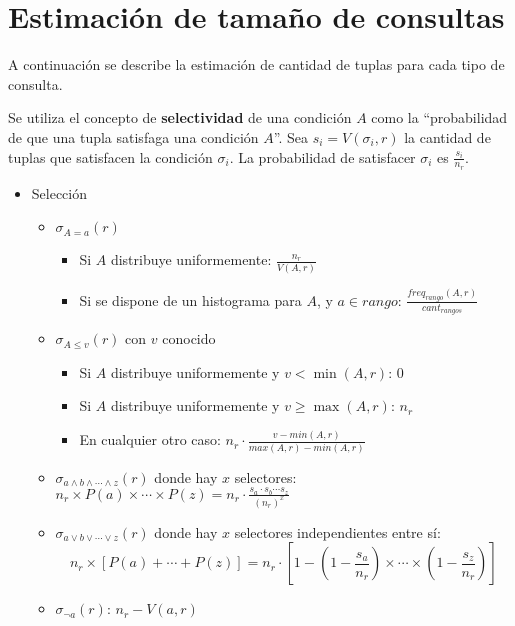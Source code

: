 \documentclass[a4paper, twoside]{article}
\begin{document}
\section{Estimación de tamaño de consultas}
A continuación se describe la estimación de cantidad de tuplas para cada tipo de consulta. 

Se utiliza el concepto de \textbf{selectividad} de una condición $A$ como la ``probabilidad de que una tupla satisfaga una condición $A$''. Sea $s_{i}=V(\sigma_{i},r)$ la cantidad de tuplas que satisfacen la condición $\sigma_{i}$. La probabilidad de satisfacer $\sigma_{i}$ es $\frac{s_{i}}{n_{r}}$.
\begin{itemize}
	\item Selección
	\begin{itemize}
		\item $\sigma_{A=a}(r)$
		\begin{itemize}
			\item Si $A$ distribuye uniformemente: $\frac{n_{r}}{V(A,r)}$
			\item Si se dispone de un histograma para $A$, y $a\in rango$: $\frac{freq_{rango}(A,r)}{cant_{rangos}}$
		\end{itemize}
		\item $\sigma_{A\leq v}(r)$ con $v$ conocido
		\begin{itemize}
			\item Si $A$ distribuye uniformemente y $v<\min(A,r)$: $0$
			\item Si $A$ distribuye uniformemente y $v\geq\max(A,r)$: $n_{r}$
			\item En cualquier otro caso: $n_{r}\cdot\frac{v-min(A,r)}{max(A,r)-min(A,r)}$
		\end{itemize}
		\item $\sigma_{a\wedge b\wedge\cdots\wedge z}(r)$ donde hay $x$ selectores: $n_{r}\times P(a)\times\cdots\times P(z)=n_{r}\cdot\frac{s_{a}\cdot s_{b}\cdots s_{z}}{\left(n_{r}\right)^{x}}$
		\item $\sigma_{a\lor b\lor\cdots\lor z}(r)$ donde hay $x$ selectores independientes entre sí: 
		\[
			n_{r}\times\left[P(a)+\cdots+P(z)\right]=n_{r}\cdot\left[1-\left(1-\frac{s_{a}}{n_{r}}\right)\times\cdots\times\left(1-\frac{s_{z}}{n_{r}}\right)\right]
		\]
		\item $\sigma_{\lnot a}(r)$: $n_{r}-V(a,r)$
	\end{itemize}


\end{itemize}
\end{document}
